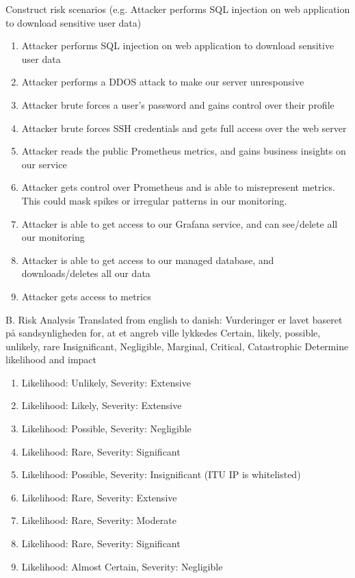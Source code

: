 Construct risk scenarios (e.g. Attacker performs SQL injection on web application to download sensitive user data)

\begin{enumerate}[label=\Alph*]
    \item Attacker performs SQL injection on web application to download sensitive user data
    \item Attacker performs a DDOS attack to make our server unresponsive
    \item Attacker brute forces a user’s password and gains control over their profile
    \item Attacker brute forces SSH credentials and gets full access over the web server
    \item Attacker reads the public Prometheus metrics, and gains business insights on our service
    \item Attacker gets control over Prometheus and is able to misrepresent metrics. This could mask spikes or irregular patterns in our monitoring.
    \item Attacker is able to get access to our Grafana service, and can see/delete all our monitoring
    \item Attacker is able to get access to our managed database, and downloads/deletes all our data
    \item Attacker gets access to metrics
\end{enumerate}


\noindent B. Risk Analysis
Translated from english to danish: Vurderinger er lavet baseret på sandsynligheden for, at et angreb ville lykkedes
Certain, likely, possible, unlikely, rare
Insignificant, Negligible, Marginal, Critical, Catastrophic
Determine likelihood and impact

\begin{enumerate}[label=\Alph*]
    \item Likelihood: Unlikely, Severity: Extensive
    \item Likelihood: Likely, Severity: Extensive
    \item Likelihood: Possible, Severity: Negligible
    \item Likelihood: Rare, Severity: Significant
    \item Likelihood: Possible, Severity: Insignificant (ITU IP is whitelisted)
    \item Likelihood: Rare, Severity: Extensive
    \item Likelihood: Rare, Severity: Moderate 
    \item Likelihood: Rare, Severity: Significant
    \item Likelihood: Almost Certain, Severity: Negligible		
\end{enumerate}

